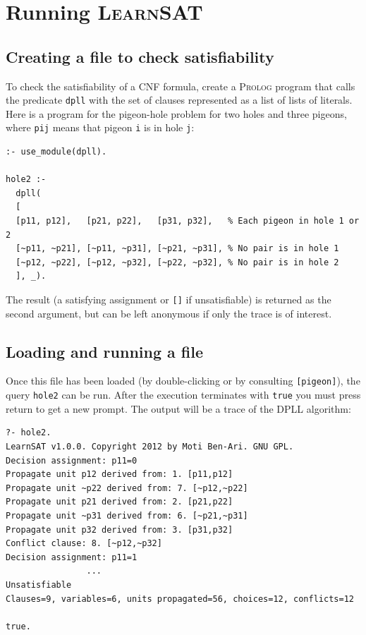 \documentclass[11pt]{article}
\newcommand*{\p}[1]{\textup{\texttt{#1}}}
\newcommand*{\ls}{\textsc{LearnSAT}}
\newcommand*{\pl}{\textsc{Prolog}}
\begin{document}
\section{Running \ls}

\subsection{Creating a file to check satisfiability}

To check the satisfiability of a CNF formula, create a \pl{} program
that calls the predicate \p{dpll} with the set of clauses represented as
a list of lists of literals. Here is a program for the pigeon-hole
problem for two holes and three pigeons, where \p{pij} means that pigeon
\p{i} is in hole \p{j}:

\begin{verbatim}
:- use_module(dpll).

hole2 :-
  dpll(
  [
  [p11, p12],   [p21, p22],   [p31, p32],   % Each pigeon in hole 1 or 2 
  [~p11, ~p21], [~p11, ~p31], [~p21, ~p31], % No pair is in hole 1
  [~p12, ~p22], [~p12, ~p32], [~p22, ~p32], % No pair is in hole 2
  ], _).
\end{verbatim}

The result (a satisfying assignment or \p{[]} if unsatisfiable) is
returned as the second argument, but can be left anonymous if only
the trace is of interest.

\subsection{Loading and running a file}

Once this file has been loaded (by double-clicking or by consulting
\p{[pigeon]}), the query \p{hole2} can be run. After the execution
terminates with \p{true} you must press return to get a new prompt. The
output will be a trace of the DPLL algorithm:

\begin{verbatim}
?- hole2.
LearnSAT v1.0.0. Copyright 2012 by Moti Ben-Ari. GNU GPL.
Decision assignment: p11=0
Propagate unit p12 derived from: 1. [p11,p12]
Propagate unit ~p22 derived from: 7. [~p12,~p22]
Propagate unit p21 derived from: 2. [p21,p22]
Propagate unit ~p31 derived from: 6. [~p21,~p31]
Propagate unit p32 derived from: 3. [p31,p32]
Conflict clause: 8. [~p12,~p32]
Decision assignment: p11=1
                ...
Unsatisfiable
Clauses=9, variables=6, units propagated=56, choices=12, conflicts=12

true.
\end{verbatim}
\end{document}
